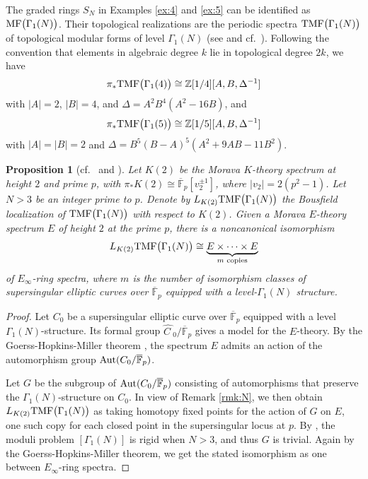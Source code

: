 \documentclass{gtpart}
\newtheorem{prop}[thm]{Proposition}
\theoremstyle{definition}
\theoremstyle{remark}
\newcommand{\mb}[1]{\mathbb{#1}}
\newcommand{\Aut}{{\rm Aut}}
\newcommand{\cF}{\overline {\mb F}}
\newcommand{\BZ}{{\mb Z}}
\newcommand{\HC}{\widehat{C~}\!}
\newcommand{\TMF}{{\rm TMF}}
\newcommand{\MF}{{\rm MF}}
\renewcommand{\D}{\Delta}
\newcommand{\G}{\Gamma}
\renewcommand{\=}{\approx}
\renewcommand{\-}{\sim}
\numberwithin{equation}{section}
\numberwithin{thm}{section}
\begin{document}
The graded rings $S_N$ in Examples \ref{ex:4} and \ref{ex:5} can be identified 
as $\MF\big(\G_1(N)\big)$.  Their topological realizations are the periodic 
spectra $\TMF\big(\G_1(N)\big)$ of topological modular forms of level $\G_1(N)$ 
(see \cite[Section 2]{tmf3} and cf.~\cite{logetaletmf}).  Following the 
convention that elements in algebraic degree $k$ lie in topological degree 
$2 k$, we have 
\[
 \pi_* \TMF\big(\G_1(4)\big) \cong \BZ[1/4][A, B, \D^{-1}] 
\]
with $|A| = 2$, $|B| = 4$, and $\D = A^2 B^4 (A^2 - 16 B)$, and 
\[
 \pi_* \TMF\big(\G_1(5)\big) \cong \BZ[1/5][A, B, \D^{-1}] 
\]
with $|A| = |B| = 2$ and $\D = B^5 (B - A)^5 (A^2 + 9 A B - 11 B^2)$.  

\begin{prop}[{cf.~\cite[Section 3.5]{BOSS} and 
\cite[Corollary on page 20]{Tnf}}]
 \label{prop:tmfe}
 Let $K(2)$ be the Morava $K$-theory spectrum at height $2$ and prime $p$, with 
 $\pi_* K(2) \cong \cF_p [v_2^{\pm 1}]$, where $|v_2| = 2 (p^2 - 1)$.  Let 
 $N > 3$ be an integer prime to $p$.  Denote by $L_{K(2)} \TMF\big(\G_1(N)\big)$ 
 the Bousfield localization of $\TMF\big(\G_1(N)\big)$ with respect to $K(2)$.  
 Given a Morava $E$-theory spectrum $E$ of height $2$ at the prime $p$, there is 
 a noncanonical isomorphism 
 \[
  L_{K(2)} \TMF\big(\G_1(N)\big) \cong 
  \underbrace{E \times \cdots \times E}_\text{$m$ copies} 
 \]
 of $E_\infty$-ring spectra, where $m$ is the number of isomorphism classes of 
 supersingular elliptic curves over $\cF_p$ equipped with a level-$\G_1(N)$ 
 structure.  
\end{prop}

\begin{proof}
 Let $C_0$ be a supersingular elliptic curve over $\cF_p$ equipped with a level 
 $\G_1(N)$-structure.  Its formal group $\HC_0 / \cF_p$ gives a model for the 
 $E$-theory.  By the Goerss-Hopkins-Miller theorem \cite[Corollary 7.6]{GH}, the 
 spectrum $E$ admits an action of the automorphism group $\Aut(C_0 / \cF_p)$.  

 Let $G$ be the subgroup of $\Aut(C_0 / \cF_p)$ consisting of automorphisms that 
 preserve the $\G_1(N)$-structure on $C_0$.  In view of Remark \ref{rmk:N}, we 
 then obtain $L_{K(2)} \TMF\big(\G_1(N)\big)$ as taking homotopy fixed points 
 for the action of $G$ on $E$, one such copy for each closed point in the 
 supersingular locus at $p$.  By \cite[Corollary 2.7.4]{KM}, the moduli problem 
 $[\G_1(N)]$ is rigid when $N > 3$, and thus $G$ is trivial.  Again by the 
 Goerss-Hopkins-Miller theorem, we get the stated isomorphism as one between 
 $E_\infty$-ring spectra.  
\end{proof}
\end{document}

